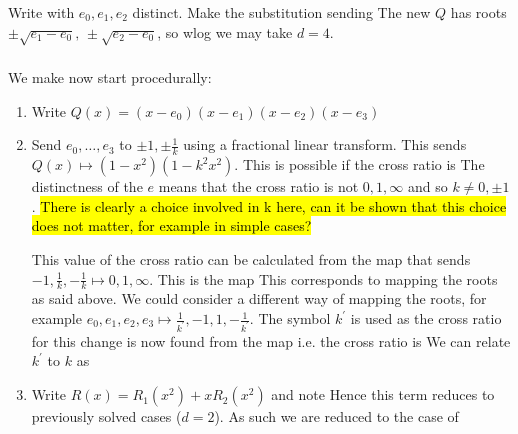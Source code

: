 \documentclass{article}
\begin{document}
\subsubsection{}
Write 
with $e_0,e_1,e_2$ distinct. Make the substitution 
sending 
The new $Q$ has roots $\pm \sqrt{e_1 - e_0}, \, \pm\sqrt{e_2 - e_0}$, so wlog we may take $d=4$.
\subsubsection{}
We make now start procedurally:
\begin{enumerate}
	\item Write $Q(x) = (x-e_0)(x-e_1)(x-e_2)(x-e_3)$
	\item Send $e_0, \dots, e_3$ to $\pm1, \pm \frac{1}{k}$ using a fractional linear transform. This sends $Q(x) \mapsto (1-x^2)(1-k^2 x^2)$. This is possible if the cross ratio is 
	The distinctness of the $e$ means that the cross ratio is not $0,1,\infty$ and so $k \neq 0, \pm 1$. \hl{There is clearly a choice involved in k here, can it be shown that this choice does not matter, for example in simple cases?}
	\begin{remark}
		This value of the cross ratio can be calculated from the map that sends $-1 ,\frac{1}{k}, -\frac{1}{k} \mapsto 0,1,\infty$. This is the map 
		This corresponds to mapping the roots as said above. We could consider a different way of mapping the roots, for example $e_0, e_1, e_2, e_3 \mapsto \frac{1}{k^\prime},-1,1,-\frac{1}{k^\prime}$. The symbol $k^\prime$ is used as the cross ratio for this change is now found from the map 
		i.e. the cross ratio is 
		We can relate $k^\prime$ to $k$ as 
	\end{remark}
	\item Write $R(x) = R_1(x^2) + xR_2(x^2)$ and note 
	Hence this term reduces to previously solved cases ($d=2$). As such we are reduced to the case of
\end{enumerate}
\end{document}
